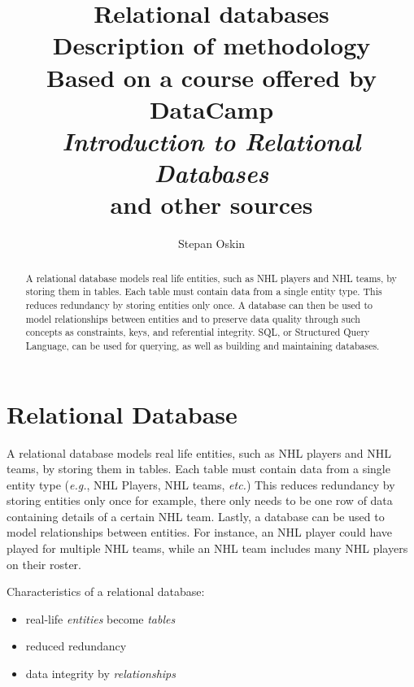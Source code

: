 \documentclass[11pt]{article}
\begin{document}
    \title{Relational databases \\
    Description of methodology \\
    Based on a course offered by DataCamp \\
    \textit{Introduction to Relational Databases} \\
    and other sources}

    \author{Stepan Oskin}

    \maketitle

    \begin{abstract}
        A relational database models real life entities, such as NHL players and NHL teams, by storing them in tables.
        Each table must contain data from a single entity type.
        This reduces redundancy by storing entities only once.
        A database can then be used to model relationships between entities and to preserve data quality through such concepts as constraints, keys, and referential integrity.
        SQL, or Structured Query Language, can be used for querying, as well as building and maintaining databases.
    \end{abstract}

    \section{Relational Database} \label{sec:rdb}

    A relational database models real life entities, such as NHL players and NHL teams, by storing them in tables.
    Each table must contain data from a single entity type (\textit{e.g.}, NHL Players, NHL teams, \textit{etc.})
    This reduces redundancy by storing entities only once \textemdash for example, there only needs to be one row of data containing details of a certain NHL team.
    Lastly, a database can be used to model relationships between entities.
    For instance, an NHL player could have played for multiple NHL teams, while an NHL team includes many NHL players on their roster.

    \vspace{5mm}

    Characteristics of a relational database:
    \begin{itemize}
        \item real-life \textit{entities} become \textit{tables}
        \item reduced redundancy
        \item data integrity by \textit{relationships}
    \end{itemize}
\end{document}

